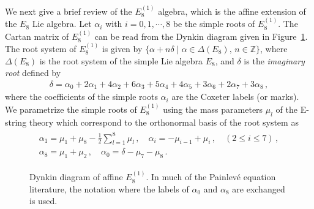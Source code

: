 \documentclass[11pt, a4paper]{article}
\theoremstyle{definition}
\begin{document}
We next give a brief review of the $ E_8^{(1)} $ algebra, which is the affine extension of the $ E_8 $ Lie algebra. Let $ \alpha_i $ with $ i=0,1,\cdots,8 $ be the simple roots of $ E_8^{(1)} $. The Cartan matrix of $ E_8^{(1)} $ can be read from the Dynkin diagram given in Figure~\ref{fig:E8dynkin}. The root system of $ E_8^{(1)} $ is given by $ \{ \alpha + n \delta \mid \alpha\in \Delta(E_8), \, n \in \mathbb{Z} \} $, where $ \Delta(E_8) $ is the root system of the simple Lie algebra $ E_8 $, and $ \delta $ is the \emph{imaginary root} defined by
\begin{align}
    \delta = \alpha_0 + 2\alpha_1 + 4\alpha_2 + 6\alpha_3 + 5\alpha_4 + 4\alpha_5 + 3\alpha_6 + 2\alpha_7 + 3\alpha_8 \, ,
\end{align}
where the coefficients of the simple roots $ \alpha_i $ are the Coxeter labels (or marks). We parametrize the simple roots of $ E_8^{(1)} $ using the mass parameters $ \mu_l $ of the E-string theory which correspond to the orthonormal basis of the root system as
\begin{gather}
    \begin{gathered}\label{eq:E81-ortho}
        \alpha_1 = \mu_1 + \mu_8 - \frac{1}{2} \sum_{l=1}^8 \mu_l \, , \quad
        \alpha_i = -\mu_{i-1} + \mu_{i} \, , \quad (2 \leq i \leq 7) \, , \\
        \alpha_8 = \mu_1 + \mu_2 \, , \quad
        \alpha_0 = \delta - \mu_7 - \mu_8 \, .
    \end{gathered}
\end{gather}

\begin{figure}
    \centering
    \caption{Dynkin diagram of affine $ E_8^{(1)} $. In much of the Painlev\'e equation literature, the notation where the labels of $ \alpha_0 $ and $ \alpha_8 $ are exchanged is used.} \label{fig:E8dynkin}
\end{figure}
\end{document}

